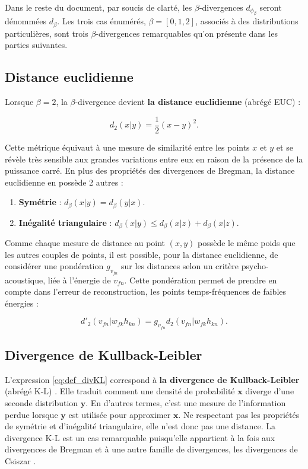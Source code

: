 Dans le reste du document, par soucis de clarté, les $\beta$-divergences $d_{\phi_{\beta}}$ seront dénommées $d_{\beta}$. Les trois cas énumérés, $\beta  = [0,1,2]$, associés à des distributions particulières, sont trois $\beta$-divergences remarquables qu'on présente dans les parties suivantes.

\subsection{Distance euclidienne}\label{part:dist_EUC}
Lorsque $\beta = 2$, la $\beta$-divergence devient \textbf{la distance euclidienne} (abrégé EUC) :

\begin{equation}
d_{{2}}(x\vert y) = \dfrac{1}{2}(x-y)^2.
\end{equation}

Cette métrique équivaut à une mesure de similarité entre les points $x$ et $y$ et se révèle très sensible aux grandes variations entre eux en raison de la présence de la puissance carré. En plus des propriétés des divergences de Bregman, la distance euclidienne en possède 2 autres :
\begin{enumerate}

\item \textbf{Symétrie} : $d_{\beta}(x \vert y ) = d_{\beta}(y \vert x)$.

\item \textbf{Inégalité triangulaire} : $d_{\beta}(x \vert y ) \leq d_{\beta}(x \vert z ) + d_{\beta}(x \vert z )$.\\
\end{enumerate}

Comme chaque mesure de distance au point $(x,y)$ possède le même poids que les autres couples de points, il est possible, pour la distance euclidienne, de considérer une pondération $g_{v_{fn}}$  sur les distances selon un critère psycho-acoustique, liée à l'énergie de $v_{fn}$. Cette pondération permet de prendre en compte dans l'erreur de reconstruction, les points temps-fréquences de faibles énergies \cite{virtanen2004separation} :

\begin{equation}
d'_2(v_{fn} \vert w_{fk} h_{kn}) = g_{v_{fn}} d_2 (v_{fn} \vert w_{fk} h_{kn}).
\end{equation}

\subsection{Divergence de Kullback-Leibler}\label{part:div_KL}
L'expression \ref{eq:def_divKL} correspond à \textbf{la divergence de Kullback-Leibler} (abrégé K-L) \cite{kompass_generalized_2007, cichocki_new_2006} . Elle traduit comment une densité de probabilité $\mathbf{x}$ diverge d'une seconde distribution $\mathbf{y}$. En d'autres termes, c'est une mesure de l'information perdue lorsque $\mathbf{y}$ est utilisée pour approximer $\mathbf{x}$. Ne respectant pas les propriétés de symétrie et d'inégalité triangulaire, elle n'est donc pas une distance. La divergence K-L est un cas remarquable puisqu'elle appartient à la fois aux divergences de Bregman et à une autre famille de divergences, les divergences de Csiszar \cite{cichocki_csiszars_2006}.

